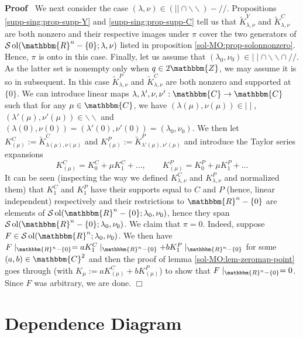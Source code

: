 \documentclass[12pt]{article}
\newcommand{\assign}{:=}
\newcommand{\tmop}[1]{\ensuremath{\operatorname{#1}}}
\renewenvironment{proof}{\noindent\textbf{Proof\ }}{\hspace*{\fill}$\Box$\medskip}
\theoremstyle{remark}
\begin{document}
\begin{proof}
  We next consider the case $(\lambda, \nu) \in (| | \cap
  \backslash\backslash) - / /$. Propositions \ref{supp-sing:prop-supp-Y} and
  \ref{supp-sing:prop-supp-C} tell us that $\tilde{K}_{\lambda, \nu}^Y$ and
  $\tilde{K}_{\lambda, \nu}^C$ are both nonzero and their respective images
  under $\pi$ cover the two generators of $\mathcal{S} \tmop{ol}
  (\mathbbm{R}^n - \{ 0 \} ; \lambda, \nu)$ listed in proposition
  \ref{sol-MO:prop-solonnonzero}. Hence, $\pi$ is onto in this case. Finally,
  let us assume that $(\lambda_0, \nu_0) \in \mid \mid \cap
  \backslash\backslash \cap / /$. As the latter set is nonempty only when $q
  \in 2\mathbbm{Z}$, we may assume it is so in subsequent. In this case
  $\tilde{K}_{\lambda, \nu}^P$ and $\tilde{K}_{\lambda, \nu}^C$ are both
  nonzero and supported at $\{ 0 \}$. We can introduce linear maps $\lambda,
  \lambda', \nu, \nu' : \mathbbm{C} \rightarrow \mathbbm{C}$ such that for any
  $\mu \in \mathbbm{C}$, we have $(\lambda (\mu), \nu (\mu)) \in \mid
  \mid$, $(\lambda' (\mu), \nu' (\mu)) \in \backslash\backslash$ and
  $(\lambda (0), \nu (0)) = (\lambda' (0), \nu' (0)) = (\lambda_0, \nu_0)$.
  We then let $K^C_{(\mu)} \assign \tilde{K}_{\lambda (\mu), \nu (\mu)}^C$ and
  $K^P_{(\mu)} \assign \tilde{K}^P_{\lambda' (\mu), \nu' (\mu)}$ and introduce
  the Taylor series expansions
  \[ K^C_{(\mu)} = K^C_0 + \mu K_1^C + \ldots, \qquad K^P_{(\mu)} = K_0^P +
     \mu K_1^P + \ldots \]
  It can be seen (inspecting the way we defined $K_{\lambda, \nu}^C$ and
  $K_{\lambda, \nu}^P$ and normalized them) that $K_1^C$ and $K_1^P$ have
  their supports equal to $C$ and $P$ (hence, linear independent) respectively
  and their restrictions to $\mathbbm{R}^n - \{ 0 \}$ are elements of
  $\mathcal{S} \tmop{ol} (\mathbbm{R}^n - \{ 0 \} ; \lambda_0, \nu_0)$, hence
  they span $\mathcal{S} \tmop{ol} (\mathbbm{R}^n - \{ 0 \} ; \lambda_0,
  \nu_0)$. We claim that $\pi = 0$. Indeed, suppose $F \in \mathcal{S}
  \tmop{ol} (\mathbbm{R}^n ; \lambda_0, \nu_0)$. We then have $F
  \mid_{\mathbbm{R}^n - \{ 0 \}} = a K_1^C \mid_{\mathbbm{R}^n - \{ 0
  \}} + b K_1^P \mid_{\mathbbm{R}^n - \{ 0 \}}$ for some $(a, b) \in
  \mathbbm{C}^2$ and then the proof of lemma \ref{sol-MO:lem-zeromap-point}
  goes through (with $K_{\mu} \assign a K_{(\mu)}^C + b K^P_{(\mu)}$) to show
  that $F \mid_{\mathbbm{R}^n - \{ 0 \}} = 0$. Since $F$ was arbitrary, we
  are done.
\end{proof}
\appendix
\newpage
\section{Dependence Diagram}
\begin{sidewaysfigure}
		\centerline{
		
		\hspace{2cm}
		}
\end{sidewaysfigure}
\newpage


\end{document}
